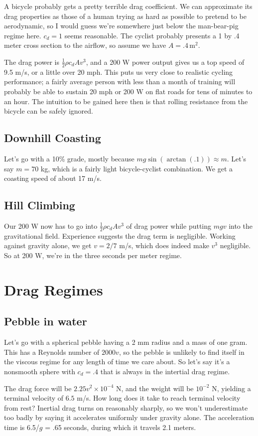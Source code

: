 \documentclass[12pt]{article}
\begin{document}
A bicycle probably gets a pretty terrible drag coefficient. We can approximate its drag properties as those of a human trying as hard as possible to pretend to be aerodynamic, so I would guess we're somewhere just below the man-bear-pig regime here. \(c_d = 1\) seems reasonable. The cyclist probably presents a 1 by .4 meter cross section to the airflow, so assume we  have \(A = .4 \, \mathrm{m}^2\).

The drag power is \(\frac{1}{2}\rho c_d A v^3\), and a 200 W power output gives us a top speed of 9.5 m/s, or a little over 20 mph. This puts us very close to realistic cycling performance; a fairly average person with less than a month of training will probably be able to sustain 20 mph or 200 W on flat roads for tens of minutes to an hour. The intuition to be gained here then is that rolling resistance from the bicycle can be safely ignored.

\subsection{Downhill Coasting}

Let's go with a 10\% grade, mostly because \(mg\sin(\arctan(.1)) \approx m\). Let's say \(m=70\) kg, which is a fairly light bicycle-cyclist combination. We get a coasting speed of about 17 m/s.

\subsection{Hill Climbing}

Our 200 W now has to go into \(\frac{1}{2}\rho c_d A v^3\) of drag power while putting \(mgv\) into the gravitational field. Experience suggests the drag term is negligible. Working against gravity alone, we get \(v=2/7\) m/s, which does indeed make \(v^3\) negligible. So at 200 W, we're in the three seconds per meter regime.

\section{Drag Regimes}

\subsection{Pebble in water}

Let's go with a spherical pebble having a 2 mm radius and a mass of one gram. This has a Reynolds number of \(2000v\), so the pebble is unlikely to find itself in the viscous regime for any length of time we care about. So let's say it's a nonsmooth sphere with \(c_d=.4\) that is always in the intertial drag regime.

The drag force will be \(2.25v^2 \times 10^{-4}\) N, and the weight will be \(10^{-2}\) N, yielding a terminal velocity of \(6.5\) m/s. How long does it take to reach terminal velocity from rest? Inertial drag turns on reasonably sharply, so we won't underestimate too badly by saying it accelerates uniformly under gravity alone. The acceleration time is 6.5/\(g\) = .65 seconds, during which it travels 2.1 meters. 
\end{document}

